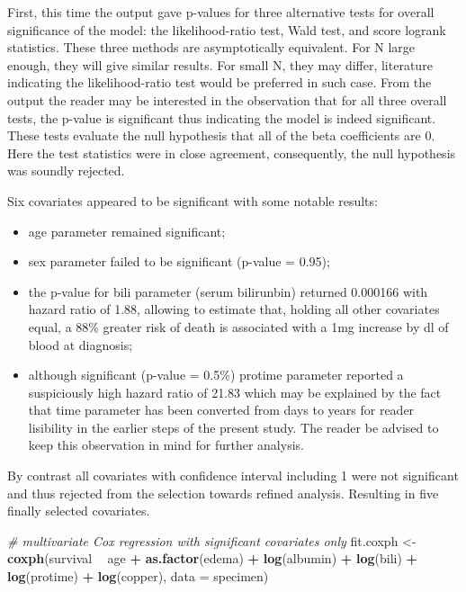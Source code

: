 \documentclass[]{article}
\newenvironment{Shaded}{\begin{snugshade}}{\end{snugshade}}
\newcommand{\KeywordTok}[1]{\textcolor[rgb]{0.13,0.29,0.53}{\textbf{#1}}}
\newcommand{\DataTypeTok}[1]{\textcolor[rgb]{0.13,0.29,0.53}{#1}}
\newcommand{\StringTok}[1]{\textcolor[rgb]{0.31,0.60,0.02}{#1}}
\newcommand{\CommentTok}[1]{\textcolor[rgb]{0.56,0.35,0.01}{\textit{#1}}}
\newcommand{\OperatorTok}[1]{\textcolor[rgb]{0.81,0.36,0.00}{\textbf{#1}}}
\newcommand{\NormalTok}[1]{#1}
\providecommand{\tightlist}{%
  \setlength{\itemsep}{0pt}\setlength{\parskip}{0pt}}
\begin{document}
First, this time the output gave p-values for three alternative tests
for overall significance of the model: the likelihood-ratio test, Wald
test, and score logrank statistics. These three methods are
asymptotically equivalent. For N large enough, they will give similar
results. For small N, they may differ, literature indicating the
likelihood-ratio test would be preferred in such case. From the output
the reader may be interested in the observation that for all three
overall tests, the p-value is significant thus indicating the model is
indeed significant. These tests evaluate the null hypothesis that all of
the beta coefficients are 0. Here the test statistics were in close
agreement, consequently, the null hypothesis was soundly rejected.

Six covariates appeared to be significant with some notable results:

\begin{itemize}
\tightlist
\item
  age parameter remained significant;
\item
  sex parameter failed to be significant (p-value = 0.95);
\item
  the p-value for bili parameter (serum bilirunbin) returned 0.000166
  with hazard ratio of 1.88, allowing to estimate that, holding all
  other covariates equal, a 88\% greater risk of death is associated
  with a 1mg increase by dl of blood at diagnosis;
\item
  although significant (p-value = 0.5\%) protime parameter reported a
  suspiciously high hazard ratio of 21.83 which may be explained by the
  fact that time parameter has been converted from days to years for
  reader lisibility in the earlier steps of the present study. The
  reader be advised to keep this observation in mind for further
  analysis.
\end{itemize}

By contrast all covariates with confidence interval including 1 were not
significant and thus rejected from the selection towards refined
analysis. Resulting in five finally selected covariates.

\begin{Shaded}
\begin{Highlighting}[]
\CommentTok{# multivariate Cox regression with significant covariates only}
\NormalTok{fit.coxph <-}\StringTok{ }\KeywordTok{coxph}\NormalTok{(survival  }\OperatorTok{~}\StringTok{ }\NormalTok{age }\OperatorTok{+}\StringTok{ }\KeywordTok{as.factor}\NormalTok{(edema) }\OperatorTok{+}\StringTok{ }\KeywordTok{log}\NormalTok{(albumin) }\OperatorTok{+}\StringTok{ }\KeywordTok{log}\NormalTok{(bili)}
                   \OperatorTok{+}\StringTok{ }\KeywordTok{log}\NormalTok{(protime) }\OperatorTok{+}\StringTok{ }\KeywordTok{log}\NormalTok{(copper), }\DataTypeTok{data =}\NormalTok{ specimen)}
\end{Highlighting}
\end{Shaded}
\end{document}
